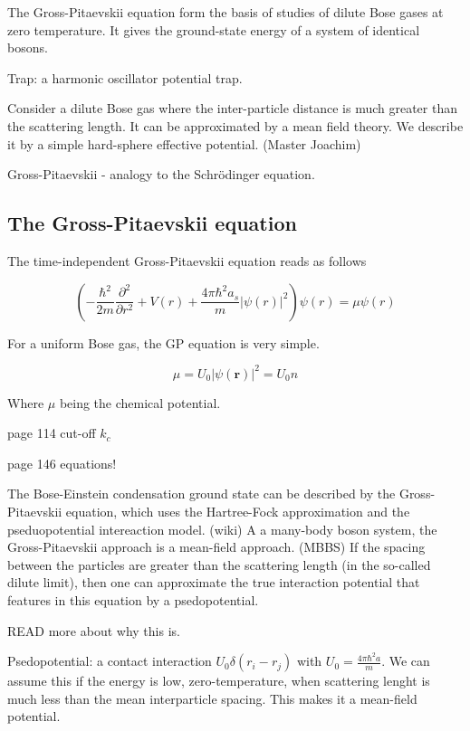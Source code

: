 The Gross-Pitaevskii equation form the basis of studies of dilute Bose gases at zero temperature. It gives the ground-state energy of a system of identical bosons.

Trap: a harmonic oscillator potential trap. 

Consider a dilute Bose gas where the inter-particle distance is much greater than the scattering length. It can be approximated by a mean field theory. We describe it by a simple hard-sphere effective potential. (Master Joachim)

Gross-Pitaevskii - analogy to the Schrödinger equation. 

\subsection{The Gross-Pitaevskii equation}

The time-independent Gross-Pitaevskii equation reads as follows

\begin{equation} \label{Gross-Pitaevskii}
\left( -\frac{\hbar^2}{2m} \frac{\partial^2}{\partial r^2} + V(r) + \frac{4 \pi \hbar^2 a_s}{m}|\psi(r)|^2 \right) \psi(r) = \mu \psi (r)
\end{equation}

For a uniform Bose gas, the GP equation is very simple.

\begin{equation}
\mu = U_0 |\psi (\textbf{r})|^2 = U_0n
\end{equation}

Where $\mu$ being the chemical potential.

page 114
cut-off $k_c$

page 146 equations!

The Bose-Einstein condensation ground state can be described by the Gross-Pitaevskii equation, which uses the Hartree-Fock approximation and the pseduopotential intereaction model. (wiki) 
A a many-body boson system, the Gross-Pitaevskii approach is a mean-field approach. (MBBS)
If the spacing between the particles are greater than the scattering length (in the so-called dilute limit), then one can approximate the true interaction potential that features in this equation by a psedopotential.

READ more about why this is.

Psedopotential: a contact interaction $U_0 \delta(r_i - r_j)$
with $U_0 = \frac{4 \pi \hbar^2 a}{m}$.
We can assume this if the energy is low, zero-temperature, when scattering lenght is much less than the mean interparticle spacing. 
This makes it a mean-field potential. 


